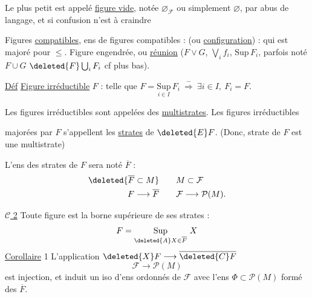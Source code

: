 Le plus petit  est appelé \uline{figure vide}, notée $\varnothing_{\mathcal F}$ ou simplement $\varnothing$, par abus de langage, et si confusion n'est à craindre


Figures \uline{compatibles}, ens de figures  compatibles :   (ou \uline{configuration}) : qui est majoré pour $\leq$.  Figure engendrée, ou \uline{réunion} ($F\vee G$, $\bigvee_i f_i$, $\mathrm{Sup}\,F_i$, parfois noté $F\cup G$  $\deleted{F}\bigcup_iF_i$ cf plus bas).

\uline{Déf} \uline{Figure irréductible} $F$ : telle que $\displaystyle F=\underset{i\in I}{\mathrm{Sup}}\,F_i\ \overset{-}{\Longrightarrow}\ \exists i\in I,\ F_i=F$.

 Les figures irréductibles sont appelées des \uline{multistrates}.  Les figures irréductibles


majorées par $F$ s'appellent les \uline{strates} de $\deleted{E}F$. (Donc,  strate de $F$ est une multistrate)

L'ens des strates de $F$  sera noté $\overline F$ : \[ \begin{aligned} \deleted{\overline F\subset M} &\qquad  M\subset\mathcal F\\ F\longrightarrow\overline F &\qquad \mathcal F\longrightarrow\mathcal P( M). \end{aligned} \]

\uline{$\mathcal C$ 2} Toute figure est la borne supérieure de ses strates : \[ F=\underset{\deleted{A}X\in\overline F}{\mathrm{Sup}}\ X \]
\uline{Corollaire} 1 L'application $\deleted{X}F\longrightarrow\overline{\deleted{C}F}$ \[ \mathcal F\longrightarrow\mathcal P( M) \] est injection, et induit un iso d'ens ordonnés de $\mathcal F$ avec l'ens $\Phi\subset\mathcal P( M)$ formé des $\overline F$.

